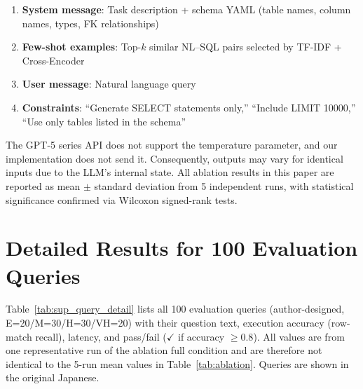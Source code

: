 \documentclass{npj-compt.mater}
\begin{document}
\begin{enumerate}
  \item \textbf{System message}: Task description + schema YAML
    (table names, column names, types, FK relationships)
  \item \textbf{Few-shot examples}: Top-$k$ similar NL--SQL pairs
    selected by TF-IDF + Cross-Encoder
  \item \textbf{User message}: Natural language query
  \item \textbf{Constraints}: ``Generate SELECT statements only,''
    ``Include LIMIT 10000,''
    ``Use only tables listed in the schema''
\end{enumerate}

The GPT-5 series API does not support the temperature parameter,
and our implementation does not send it.
Consequently, outputs may vary for identical inputs due to the
LLM's internal state.
All ablation results in this paper are reported as mean $\pm$
standard deviation from 5 independent runs, with statistical
significance confirmed via Wilcoxon signed-rank tests.

\section{Detailed Results for 100 Evaluation Queries}
\label{sec:sup_query_detail}

Table~\ref{tab:sup_query_detail} lists all 100 evaluation queries
(author-designed, E=20/M=30/H=30/VH=20) with their question text,
execution accuracy (row-match recall), latency, and
pass/fail ($\checkmark$ if accuracy $\geq 0.8$).
All values are from one representative run of the ablation full
condition and are therefore not identical to the 5-run mean values
in Table~\ref{tab:ablation}. Queries are shown in the original Japanese.
\end{document}
